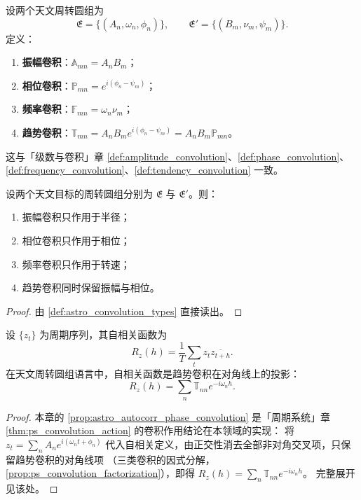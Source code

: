 \begin{definition}\label{def:astro_convolution_types}
设两个天文周转圆组为
\[
\mathfrak E=\{(A_n,\omega_n,\phi_n)\},\qquad
\mathfrak E'=\{(B_m,\nu_m,\psi_m)\}.
\]
定义：
\begin{enumerate}[label=(\roman*)]
    \item \textbf{振幅卷积}：\(\mathbb A_{mn}=A_nB_m\)；
    \item \textbf{相位卷积}：\(\mathbb P_{mn}=e^{i(\phi_n-\psi_m)}\)；
    \item \textbf{频率卷积}：\(\mathbb F_{mn}=\omega_n\nu_m\)；
    \item \textbf{趋势卷积}：\(\mathbb T_{mn}=A_nB_m e^{i(\phi_n-\psi_m)}=A_nB_m\mathbb P_{mn}\)。
\end{enumerate}
这与「级数与卷积」章 \cref{def:amplitude_convolution}、\cref{def:phase_convolution}、\cref{def:frequency_convolution}、\cref{def:tendency_convolution} 一致。
\end{definition}

\begin{theorem}[三类卷积在天文周转圆组上的作用]\label{thm:astro_convolution_action}
设两个天文目标的周转圆组分别为 \(\mathfrak E\) 与 \(\mathfrak E'\)。则：
\begin{enumerate}[label=(\roman*)]
    \item 振幅卷积只作用于半径；
    \item 相位卷积只作用于相位；
    \item 频率卷积只作用于转速；
    \item 趋势卷积同时保留振幅与相位。
\end{enumerate}
\end{theorem}

\begin{proof}
由 \cref{def:astro_convolution_types} 直接读出。
\end{proof}

\begin{proposition}[自相关与趋势卷积]\label{prop:astro_autocorr_phase_convolution}
设 \(\{z_t\}\) 为周期序列，其自相关函数为
\[
R_z(h)=\frac1T\sum_t z_t\overline{z_{t+h}}.
\]
在天文周转圆组语言中，自相关函数是趋势卷积在对角线上的投影：
\[
R_z(h)=\sum_n\mathbb T_{nn}e^{-i\omega_n h}.
\]
\end{proposition}

\begin{proof}
本章的 \cref{prop:astro_autocorr_phase_convolution} 是「周期系统」章 \cref{thm:ps_convolution_action} 的卷积作用结论在本领域的实现：
将 $z_t=\sum_n A_n e^{i(\omega_n t+\phi_n)}$ 代入自相关定义，由正交性消去全部非对角交叉项，只保留趋势卷积的对角线项
（三类卷积的因式分解，\cref{prop:ps_convolution_factorization}），即得 $R_z(h)=\sum_n\mathbb T_{nn}e^{-i\omega_n h}$。
完整展开见该处。
\end{proof}

